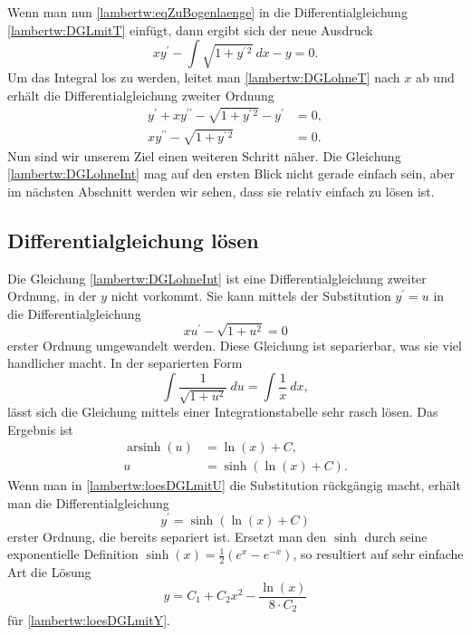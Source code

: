 Wenn man nun \eqref{lambertw:eqZuBogenlaenge} in die Differentialgleichung \eqref{lambertw:DGLmitT} einfügt, dann ergibt sich der neue Ausdruck
\begin{equation}
	x y^{\prime} - \int\sqrt{1+y^{\prime\, 2}} \: dx - y
	= 0.
	\label{lambertw:DGLohneT}
\end{equation}
Um das Integral los zu werden, leitet man \eqref{lambertw:DGLohneT} nach \(x\) ab und erhält die Differentialgleichung zweiter Ordnung 
\begin{align}
	y^{\prime}+ xy^{\prime\prime} - \sqrt{1+y^{\prime\, 2}} - y^{\prime}
	&= 0, \\
	xy^{\prime\prime} - \sqrt{1+y^{\prime\, 2}}
	&= 0.
	\label{lambertw:DGLohneInt}
\end{align}
Nun sind wir unserem Ziel einen weiteren Schritt näher. Die Gleichung \eqref{lambertw:DGLohneInt} mag auf den ersten Blick nicht gerade einfach sein, aber im nächsten Abschnitt werden wir sehen, dass sie relativ einfach zu lösen ist.

\subsection{Differentialgleichung lösen
	\label{lambertw:subsection:DGLloes}}
Die Gleichung \eqref{lambertw:DGLohneInt} ist eine Differentialgleichung zweiter Ordnung, in der \(y\) nicht vorkommt. Sie kann mittels der Substitution \(y^{\prime} = u\) in die Differentialgleichung
\begin{equation}
	xu^{\prime} - \sqrt{1+u^2}
	= 0
	\label{lambertw:DGLmitU}
\end{equation}
erster Ordnung umgewandelt werden.
Diese Gleichung ist separierbar, was sie viel handlicher macht. In der separierten Form
\begin{equation}
	\int{\frac{1}{\sqrt{1+u^2}}\:du} 
	= 
	\int{\frac{1}{x}\:dx},
\end{equation}
lässt sich die Gleichung mittels einer Integrationstabelle sehr rasch lösen. 
Das Ergebnis ist 
\begin{align}
	\operatorname{arsinh}(u)
	&=
	\operatorname{ln}(x) + C, \\
	u
	&=
	\operatorname{sinh}(\operatorname{ln}(x) + C).
	\label{lambertw:loesDGLmitU}
\end{align}
Wenn man in \eqref{lambertw:loesDGLmitU} die Substitution rückgängig macht, erhält man die Differentialgleichung 
\begin{equation}
	y^{\prime}
	=
	\operatorname{sinh}(\operatorname{ln}(x) + C)
	\label{lambertw:loesDGLmitY}
\end{equation}
erster Ordnung, die bereits separiert ist.
Ersetzt man den \(\operatorname{sinh}\) durch seine exponentielle Definition \(\operatorname{sinh}(x)=\frac{1}{2}(e^x-e^{-x})\), so resultiert auf sehr einfache Art die Lösung 
\begin{equation}
	y
	=
	C_1 + C_2 x^2 - \frac{\operatorname{ln}(x)}{8 \cdot C_2}
\end{equation}
für \eqref{lambertw:loesDGLmitY}.

